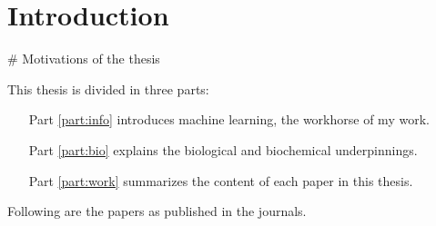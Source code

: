 \chapter{Introduction}
\# Motivations of the thesis

This thesis is divided in three parts:

\begin{itemize}
	\item[Part \ref{part:info}] introduces machine learning, the workhorse of my work.
	\item[Part \ref{part:bio}] explains the biological and biochemical underpinnings.
	\item[Part \ref{part:work}] summarizes the content of each paper in this thesis.
\end{itemize}

Following are the papers as published in the journals.

